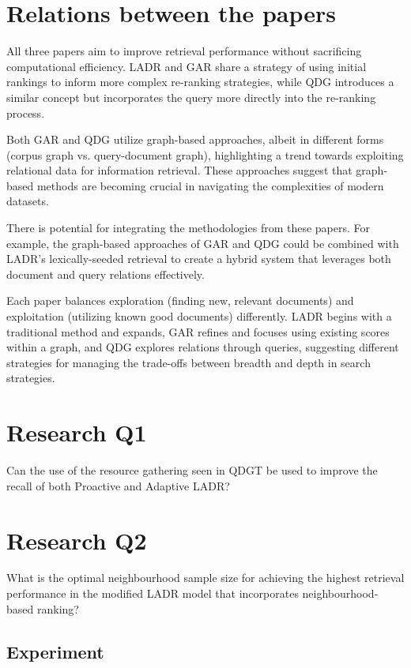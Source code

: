 \documentclass[sigconf,authorversion,nonacm]{acmart}
\begin{document}
\section{Relations between the papers}

All three papers aim to improve retrieval performance without sacrificing computational efficiency.
LADR and GAR share a strategy of using initial rankings to inform more complex re-ranking
strategies, while QDG introduces a similar concept but incorporates the query more directly into the
re-ranking process.

Both GAR and QDG utilize graph-based approaches, albeit in different forms (corpus graph vs.
query-document graph), highlighting a trend towards exploiting relational data for information
retrieval. These approaches suggest that graph-based methods are becoming crucial in navigating the
complexities of modern datasets.

There is potential for integrating the methodologies from these papers. For example, the graph-based
approaches of GAR and QDG could be combined with LADR's lexically-seeded retrieval to create a
hybrid system that leverages both document and query relations effectively.

Each paper balances exploration (finding new, relevant documents) and exploitation (utilizing known
good documents) differently. LADR begins with a traditional method and expands, GAR refines and
focuses using existing scores within a graph, and QDG explores relations through queries, suggesting
different strategies for managing the trade-offs between breadth and depth in search strategies.

\section{Research Q1}

Can the use of the resource gathering seen in QDGT\cite{query-document} be used to improve the
recall of both Proactive and Adaptive LADR?

\section{Research Q2}

What is the optimal neighbourhood sample size for achieving the highest retrieval performance in the
modified LADR model that incorporates neighbourhood-based ranking?

\subsection{Experiment}
\end{document}

